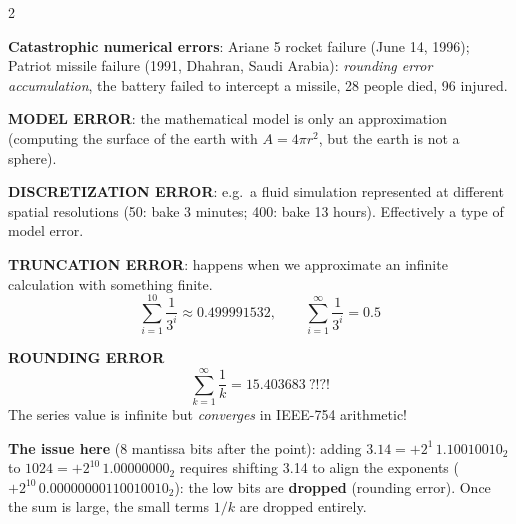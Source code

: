 \documentclass[a4paper,9pt]{extarticle}
\begin{document}
\begin{multicols}{2}
\begin{example}
\textbf{Catastrophic numerical errors}: Ariane 5 rocket failure (June 14, 1996); Patriot missile
failure (1991, Dhahran, Saudi Arabia): \emph{rounding error accumulation}, the battery failed to
intercept a missile, 28 people died, 96 injured.

\end{example}


\begin{definition}

\textbf{MODEL ERROR}: the mathematical model is only an approximation (computing the surface of
the earth with $A = 4\pi r^2$, but the earth is not a sphere).

\end{definition}


\begin{definition}

\textbf{DISCRETIZATION ERROR}: e.g.\ a fluid simulation represented at different spatial
resolutions (50: bake 3 minutes; 400: bake 13 hours). Effectively a type of model error.

\end{definition}


\begin{definition}

\textbf{TRUNCATION ERROR}: happens when we approximate an infinite calculation with something
finite.
\[
\sum_{i=1}^{10} \frac{1}{3^i} \approx 0.499991532, \qquad
\sum_{i=1}^{\infty} \frac{1}{3^i} = 0.5
\]

\end{definition}


\begin{definition}

\textbf{ROUNDING ERROR}
\[
\sum_{k=1}^{\infty} \frac{1}{k} = 15.403683 \ ?!?!
\]
The series value is infinite but \emph{converges} in IEEE-754 arithmetic!

\end{definition}


\begin{example}

\textbf{The issue here} (8 mantissa bits after the point): adding $3.14 = +2^1\,1.10010010_2$ to
$1024 = +2^{10}\,1.00000000_2$ requires shifting 3.14 to align the exponents
($+2^{10}\,0.00000000110010010_2$): the low bits are \textbf{dropped} (rounding error). Once the
sum is large, the small terms $1/k$ are dropped entirely.

\end{example}




\end{multicols}
\end{document}
